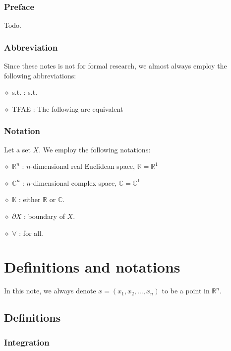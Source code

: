 \documentclass[11pt,a4paper]{report}
\theoremstyle{definition}
\begin{document}
\newpage

\tableofcontents

\newpage

\subsection*{Preface}

Todo.


\subsection*{Abbreviation}

Since these notes is not for formal research, we almost always employ the following abbreviations:

\noindent $\diamond$ s.t. : s.t.

\noindent $\diamond$ TFAE : The following are equivalent


\subsection*{Notation}

Let a set $X$. 
We employ the following notations:

\noindent $\diamond$ $\mathbb{R}^{n}$ : $n$-dimensional real Euclidean space, $\mathbb{R}=\mathbb{R}^{1}$

\noindent $\diamond$ $\mathbb{C}^{n}$ : $n$-dimensional complex space, $\mathbb{C}=\mathbb{C}^{1}$

\noindent $\diamond$ $\mathbb{K}$ : either $\mathbb{R}$ or $\mathbb{C}$.

\noindent $\diamond$ $\partial X$ : boundary of $X$.

\noindent $\diamond$ $\forall$ : for all.

\chapter{Definitions and notations} 

In this note, we always denote $x=(x_1, x_2, \ldots, x_n)$ to be a point in $\mathbb{R}^{n}$.

\section{Definitions}

\subsection{Integration}
\end{document}
